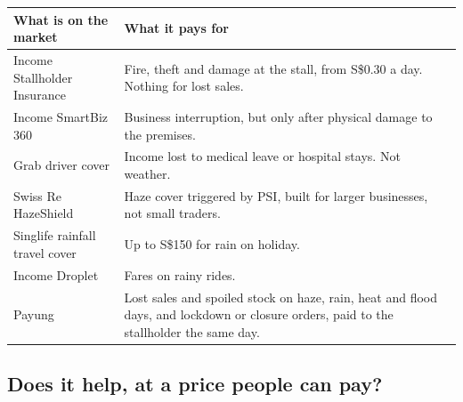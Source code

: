 \documentclass[11pt,a4paper]{article}
\newcommand{\head}{\rowcolor{soft}}
\newcommand{\sgd}{\textup{S\$}}
\begin{document}
{\small
\begin{xltabular}{\textwidth}{|K{4.4cm}|Y|}
\hline
\head What is on the market & \textbf{What it pays for} \\
\hline
\endhead
Income Stallholder Insurance & Fire, theft and damage at the stall, from \sgd 0.30 a day.\cite{income-stall} Nothing for lost sales. \\
\hline
Income SmartBiz 360 & Business interruption, but only after physical damage to the premises.\cite{ps} \\
\hline
Grab driver cover & Income lost to medical leave or hospital stays.\cite{grab} Not weather. \\
\hline
Swiss Re HazeShield & Haze cover triggered by PSI, built for larger businesses, not small traders.\cite{ps} \\
\hline
Singlife rainfall travel cover & Up to \sgd 150 for rain on holiday.\cite{ps} \\
\hline
Income Droplet & Fares on rainy rides.\cite{ps} \\
\hline
{}Payung & Lost sales and spoiled stock on haze, rain, heat and flood days, and lockdown or closure orders, paid to the stallholder the same day. \\
\hline
\end{xltabular}}

\subsection{Does it help, at a price people can pay?}\label{sec:impact}
\end{document}
